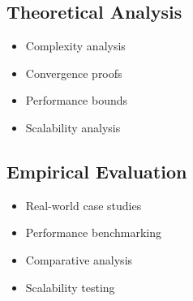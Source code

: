 \subsection{Theoretical Analysis}
\begin{itemize}
    \item Complexity analysis
    \item Convergence proofs
    \item Performance bounds
    \item Scalability analysis
\end{itemize}

\subsection{Empirical Evaluation}
\begin{itemize}
    \item Real-world case studies
    \item Performance benchmarking
    \item Comparative analysis
    \item Scalability testing
\end{itemize} 